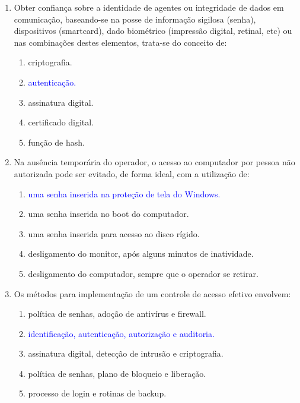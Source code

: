 \documentclass{report}
\begin{document}
\begin{enumerate}
		\item Obter confiança sobre a identidade de agentes ou integridade de dados em comunicação, baseando-se na posse de informação sigilosa (senha), dispositivos (smartcard), dado biométrico (impressão digital, retinal, etc) ou nas combinações destes elementos, trata-se do conceito de:
		\begin{enumerate}[label=(\alph*)]
			\item criptografia.
			\item \textcolor{blue}{autenticação.}
			\item assinatura digital.
			\item certificado digital.
			\item função de hash.
		\end{enumerate}
		
		\item Na ausência temporária do operador, o acesso ao computador por pessoa não autorizada pode ser evitado, de forma ideal, com a utilização de:
		\begin{enumerate}[label=(\alph*)]
			\item \textcolor{blue}{uma senha inserida na proteção de tela do Windows.}
			\item uma senha inserida no boot do computador.
			\item uma senha inserida para acesso ao disco rígido.
			\item desligamento do monitor, após alguns minutos de inatividade.
			\item desligamento do computador, sempre que o operador se retirar.
		\end{enumerate}
		
		\item Os métodos para implementação de um controle de acesso efetivo envolvem:
		\begin{enumerate}[label=(\alph*)]
			\item política de senhas, adoção de antivírus e firewall.
			\item \textcolor{blue}{identificação, autenticação, autorização e auditoria.}
			\item assinatura digital, detecção de intrusão e criptografia.
			\item política de senhas, plano de bloqueio e liberação.
			\item processo de login e rotinas de backup.
		\end{enumerate}
		
	\end{enumerate}
	
\end{document}
